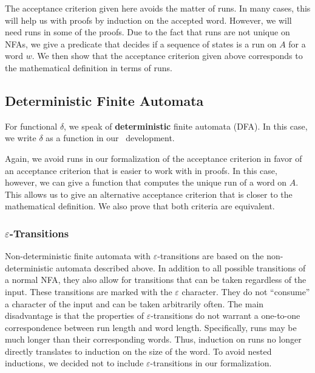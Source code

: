 The acceptance criterion given here avoids the matter of runs.
In many cases, this will help us with proofs by induction on the accepted word.
However, we will need runs in some of the proofs.
Due to the fact that runs are not unique on NFAs, 
we give a predicate that decides if a sequence of states is a run on $A$ for a word $w$.
We then show that the acceptance criterion given above corresponds to the mathematical definition in terms of runs.


\subsection{Deterministic Finite Automata}
For functional $\delta$, we speak of \textbf{deterministic} finite automata (DFA). 
In this case, we write $\delta$ as a function in our \coq\ development. 



Again, we avoid runs in our formalization of the acceptance criterion in favor of an acceptance criterion that is easier to work with in proofs.
In this case, however, we can give a function that computes the unique run of a word on $A$.
This allows us to give an alternative acceptance criterion that is closer to the mathematical definition.
We also prove that both criteria are equivalent.



%


\subsubsection{$\varepsilon$-Transitions}
Non-deterministic finite automata with $\varepsilon$-transitions are based on the non-deterministic automata described above.
In addition to all possible transitions of a normal NFA, they also allow for transitions that can be taken regardless of the input. 
These transitions are marked with the $\varepsilon$ character. 
They do not ``consume'' a character of the input and can be taken arbitrarily often.
The main disadvantage is that the properties of $\varepsilon$-transitions do not warrant a one-to-one correspondence between
run length and word length. 
Specifically, runs may be much longer than their corresponding words. 
Thus, induction on runs no longer directly translates to induction on the size of the word.
To avoid nested inductions, we decided not to include $\varepsilon$-transitions in our formalization.

